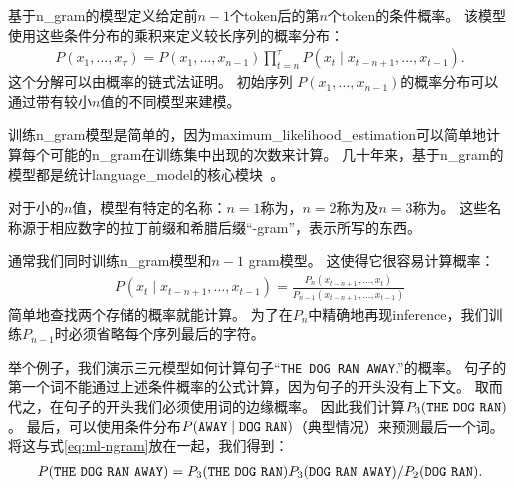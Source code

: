 基于\gls{n_gram}的模型定义给定前$n-1$个\gls{token}后的第$n$个\gls{token}的条件概率。
该模型使用这些条件分布的乘积来定义较长序列的概率分布：
\begin{align}
P(x_1, \dots, x_\tau) = P(x_1, \dots, x_{n-1}) \prod_{t=n}^\tau P(x_t \mid x_{t-n+1}, \dots, x_{t-1} ).
\end{align}
这个分解可以由概率的链式法证明。
初始序列 $P(x_1, \dots, x_{n-1})$的概率分布可以通过带有较小$n$值的不同模型来建模。

训练\gls{n_gram}模型是简单的，因为\gls{maximum_likelihood_estimation}可以简单地计算每个可能的\gls{n_gram}在训练集中出现的次数来计算。                                                                                                                                                                                                                                                                                                                                                                                       
几十年来，基于\gls{n_gram}的模型都是统计\gls{language_model}的核心模块~\citep{Jelinek+Mercer80,Katz87,Chen+Goodman99}。

对于小的$n$值，模型有特定的名称：$n=1$称为，$n=2$称为及$n=3$称为。
这些名称源于相应数字的拉丁前缀和希腊后缀``-gram''，表示所写的东西。


通常我们同时训练\gls{n_gram}模型和$n-1$ gram模型。 
这使得它很容易计算概率：
\begin{align}
\label{eq:ml-ngram}
P(x_t \mid x_{t-n+1}, \dots, x_{t-1}) = \frac{P_n(x_{t-n+1}, \dots, x_t)} { P_{n-1}( x_{t-n+1}, \dots, x_{t-1}) }
\end{align}
简单地查找两个存储的概率就能计算。
为了在$P_n$中精确地再现\gls{inference}，我们训练$P_{n-1}$时必须省略每个序列最后的字符。

举个例子，我们演示三元模型如何计算句子``{\tt THE DOG RAN AWAY}.''的概率。
句子的第一个词不能通过上述条件概率的公式计算，因为句子的开头没有上下文。
取而代之，在句子的开头我们必须使用词的边缘概率。
因此我们计算$P_3({\tt THE\ DOG\ RAN})$。
最后，可以使用条件分布$P({\tt AWAY} \mid {\tt DOG\ RAN})$（典型情况）来预测最后一个词。
将这与式\eqref{eq:ml-ngram}放在一起，我们得到：
\begin{align}
P({\tt THE\ DOG\ RAN\ AWAY}) = P_3({\tt THE\ DOG\ RAN}) P_3({\tt DOG\ RAN\ AWAY}) / P_2({\tt DOG\ RAN}).
\end{align}

